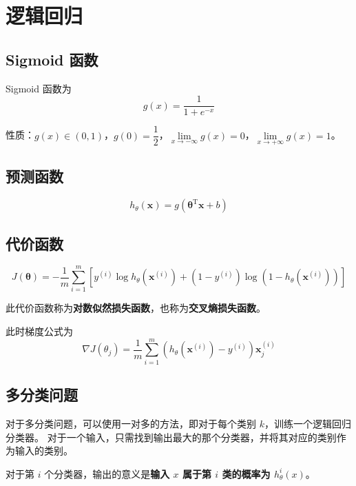 \section{逻辑回归}

\subsection{Sigmoid 函数}
Sigmoid 函数为
\begin{equation}
    g(x) = \dfrac{1}{1 + e^{-x}}
\end{equation}

性质：$g(x) \in (0, 1)$，$g(0) = \dfrac 12$，$\lim\limits_{x \to -\infty}g(x) = 0$，$\lim\limits_{x \to +\infty}g(x) = 1$。

\subsection{预测函数}
\begin{equation}
    h_\theta(\boldsymbol{x}) = g(\boldsymbol{\theta}^\mathrm T\boldsymbol{x} + b)
\end{equation}
    
\subsection{代价函数}
\begin{equation}
    J(\boldsymbol{\theta}) = -\dfrac{1}{m}\sum_{i=1}^m\left[y^{(i)}\log h_\theta(\boldsymbol{x}^{(i)}) + (1 - y^{(i)})\log(1 - h_\theta(\boldsymbol{x}^{(i)}))\right]
\end{equation}

此代价函数称为\textbf{对数似然损失函数}，也称为\textbf{交叉熵损失函数}。

此时梯度公式为
\begin{equation}
    \nabla J(\theta_j) = \dfrac{1}{m}\sum_{i=1}^m(h_\theta(\boldsymbol{x}^{(i)}) - y^{(i)})\boldsymbol{x}^{(i)}_j
\end{equation}

\subsection{多分类问题}
对于多分类问题，可以使用一对多的方法，即对于每个类别 $k$，训练一个逻辑回归分类器。
对于一个输入，只需找到输出最大的那个分类器，并将其对应的类别作为输入的类别。

对于第 $i$ 个分类器，输出的意义是\textbf{输入 $x$ 属于第 $i$ 类的概率为 $h^i_\theta(x)$}。